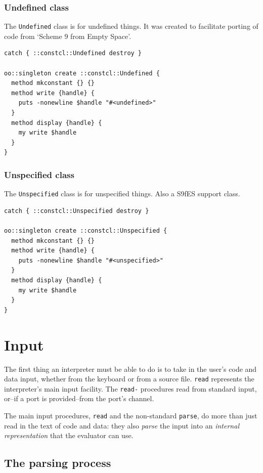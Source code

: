 \documentclass[twoside,9pt]{report}
\begin{document}
\subsection{Undefined class}
\label{undefined-class}


The \texttt{Undefined} class is for undefined things. It was created to facilitate porting of code from `Scheme 9 from Empty Space'.

\begin{lstlisting}
catch { ::constcl::Undefined destroy }

oo::singleton create ::constcl::Undefined {
  method mkconstant {} {}
  method write {handle} {
    puts -nonewline $handle "#<undefined>"
  }
  method display {handle} {
    my write $handle
  }
}
\end{lstlisting}
\subsection{Unspecified class}
\label{unspecified-class}


The \texttt{Unspecified} class is for unspecified things. Also a S9fES support class.

\begin{lstlisting}
catch { ::constcl::Unspecified destroy }

oo::singleton create ::constcl::Unspecified {
  method mkconstant {} {}
  method write {handle} {
    puts -nonewline $handle "#<unspecified>"
  }
  method display {handle} {
    my write $handle
  }
}
\end{lstlisting}
\chapter{Input}
\label{input}


The first thing an interpreter must be able to do is to take in the user's code and data input, whether from the keyboard or from a source file. \texttt{read} represents the interpreter's main input facility. The \texttt{read-} procedures read from standard input, or--if a port is provided--from the port's channel.


The main input procedures, \texttt{read} and the non-standard \texttt{parse}, do more than just read in the text of code and data: they also \emph{parse} the input into an \emph{internal representation} that the evaluator can use.

\section{The parsing process}
\label{the-parsing-process}
\end{document}
